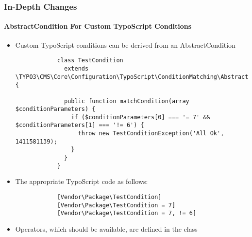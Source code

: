 \begin{frame}[fragile]
	\frametitle{In-Depth Changes}
	\framesubtitle{AbstractCondition For Custom TypoScript Conditions}

	\lstset{
		basicstyle=\tiny\ttfamily
	}

	\begin{itemize}
		\item Custom TypoScript conditions can be derived from an AbstractCondition

		\begin{lstlisting}
			class TestCondition
			  extends \TYPO3\CMS\Core\Configuration\TypoScript\ConditionMatching\AbstractCondition {

			  public function matchCondition(array $conditionParameters) {
 			    if ($conditionParameters[0] === '= 7' && $conditionParameters[1] === '!= 6') {
			      throw new TestConditionException('All Ok', 1411581139);
			    }
			  }
			}
		\end{lstlisting}

		\item The appropriate TypoScript code as follows:

		\begin{lstlisting}
			[Vendor\Package\TestCondition]
			[Vendor\Package\TestCondition = 7]
			[Vendor\Package\TestCondition = 7, != 6]
		\end{lstlisting}

		\item Operators, which should be available, are defined in the class

	\end{itemize}

\end{frame}


